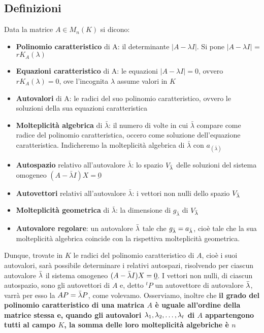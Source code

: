 \documentclass[../main.tex]{subfiles}
\begin{document}
\subsection{Definizioni}
Data la matrice $A\in M_n(K)$ si dicono:
\begin{itemize}
    \item \textbf{Polinomio caratteristico} di A: il determinante $|A-\lambda I|$. Si pone $|A-\lambda I|$ = $rK_A(\lambda)$
    \item \textbf{Equazioni caratteristico} di A: le equazioni $|A-\lambda I| = 0$, ovvero $rK_A(\lambda) = 0$, ove l'incognita $\lambda$ assume valori in $K$
    \item \textbf{Autovalori} di A: le radici del suo polinomio caratteristico, ovvero le soluzioni della sua equazioni caratteristica
    \item \textbf{Molteplicità algebrica} di $\bar{\lambda}$: il numero di volte in cui $\bar{\lambda}$ compare come radice del polinomio caratteristica, occero come soluzione dell'equazione caratteristica. Indicheremo la molteplicità algebrica di $\bar{\lambda}$ con $a_(\bar{\lambda})$
    \item \textbf{Autospazio} relativo all'autovalore $\bar{\lambda}$: lo spazio $V_{\Bar{\lambda}}$ delle soluzioni del sistema omogeneo $(A-\bar{\lambda}I)X = \underbar{0}$
    \item \textbf{Autovettori} relativi all'autovalore $\bar{\lambda}$: i vettori non nulli dello spazio $V_{\Bar{\lambda}}$
    \item \textbf{Molteplicità geometrica} di $\bar{\lambda}$: la dimensione di $g_{\bar{\lambda}}$ di $V_{\Bar{\lambda}}$
    \item \textbf{Autovalore regolare}: un autovalore $\Bar{\lambda}$ tale che $g_{\Bar{\lambda}} = a_{\Bar{\lambda}}$, cioè tale che la sua molteplicità algebrica coincide con la rispettiva molteplicità geometrica.
\end{itemize}
Dunque, trovate in $K$ le radici del polinomio caratteristico di $A$, cioè i suoi autovalori, sarà possibile determinare i relativi autospazi, risolvendo per ciascun autovalore $\Bar{\lambda}$
il sistema omogeneo $(A-\Bar{\lambda}I)X = \underbar{0}$. I vettori non nulli, di ciascun autospazio, sono gli autovettori di $A$ e, detto ${^{t}P}$ un autovettore di autovalore $\Bar{\lambda}$, varrà per esso la $AP = \Bar{\lambda}P$, come volevamo.
Osserviamo, inoltre che \textbf{il grado del polinomio caratteristico di una matrica $A$ è uguale all'ordine della matrice stessa e, quando gli autovalori $\lambda_1, \lambda_2, \ldots, \lambda_{t}$ di $A$ appartengono tutti al campo $K$, la somma delle loro molteplicità algebriche è $n$}
\end{document}
